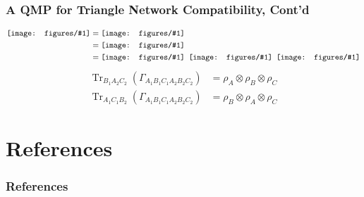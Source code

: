 \documentclass[
    9pt,
    hyperref={bookmarks=false, colorlinks=false}, %
    xcolor={dvipsnames},
]{beamer}
\DeclareMathOperator{\Tr}{Tr}
\newcommand{\incstr}[1]{\vcenter{\hbox{\texttt{[image: figures/\#1]}}}} %
\begin{document}
\begin{frame}
    \frametitle{A QMP for Triangle Network Compatibility, Cont'd}
    \begin{align*}
        \incstr{triangle_sextuple_discard_3.pdf} 
        &= \incstr{triangle_production_ring_discard_3.pdf} \\
        &= \incstr{triangle_production_ring_discard_3_pulldown.pdf} \\
        &= \incstr{triangle_marg_state_A.pdf} \hspace{0.5em}\incstr{triangle_marg_state_C.pdf}\hspace{0.5em}\incstr{triangle_marg_state_B.pdf}
    \end{align*}
    \begin{align*}
        \Tr_{B_1A_2C_2}(\Gamma_{A_1B_1C_1A_2B_2C_2}) &= \rho_{A} \otimes \rho_{B} \otimes \rho_{C} \\
        \Tr_{A_1C_1B_2}(\Gamma_{A_1B_1C_1A_2B_2C_2}) &= \rho_{B} \otimes \rho_{A} \otimes \rho_{C}
    \end{align*}
\end{frame}

\section{References}
\begin{frame}[allowframebreaks]
    \frametitle{References}
    \printbibliography
\end{frame}
\end{document}
